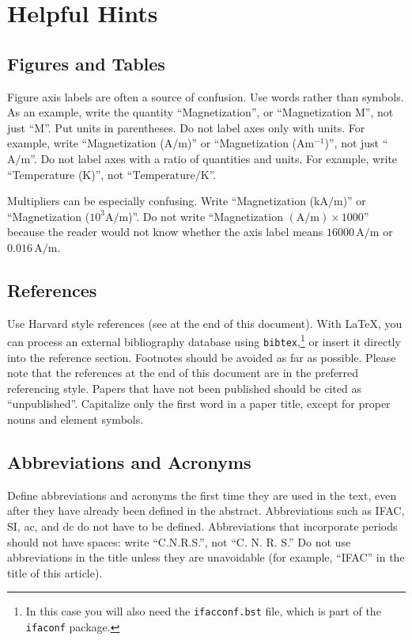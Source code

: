 \documentclass{ifacconf}
\begin{document}
\section{Helpful Hints}

\subsection{Figures and Tables}

Figure axis labels are often a source of confusion. Use words rather
than symbols. As an example, write the quantity ``Magnetization'', or
``Magnetization M'', not just ``M''. Put units in parentheses. Do not
label axes only with units.  For example, write ``Magnetization
($\mathrm{A}/\mathrm{m}$)'' or ``Magnetization ($\mathrm{A} \mathrm{m}^{-1}$)'', not just
 ``$\mathrm{A}/\mathrm{m}$''. Do not
label axes with a ratio of quantities and units. For example, write
``Temperature ($\mathrm{K}$)'', not ``$\mbox{Temperature}/\mathrm{K}$''.

Multipliers can be especially confusing. Write ``Magnetization
($\mathrm{kA}/\mathrm{m}$)'' or ``Magnetization ($10^3 \mathrm{A}/\mathrm{m}$)''. Do not write
``Magnetization $(\mathrm{A}/\mathrm{m}) \times 1000$'' because the reader would not know
whether the axis label means $16000\,\mathrm{A}/\mathrm{m}$ or $0.016\,\mathrm{A}/\mathrm{m}$.

\subsection{References}

Use Harvard style references (see at the end of this document). With
\LaTeX, you can process an external bibliography database 
using \texttt{bibtex},\footnote{In this case you will also need the \texttt{ifacconf.bst}
file, which is part of the \texttt{ifaconf} package.}
or insert it directly into the reference section. Footnotes should be avoided as
far as possible.  Please note that the references at the end of this
document are in the preferred referencing style. Papers that have not
been published should be cited as ``unpublished''.  Capitalize only the
first word in a paper title, except for proper nouns and element
symbols.

\subsection{Abbreviations and Acronyms}

Define abbreviations and acronyms the first time they are used in the
text, even after they have already been defined in the
abstract. Abbreviations such as IFAC, SI, ac, and dc do not have to be
defined. Abbreviations that incorporate periods should not have
spaces: write ``C.N.R.S.'', not ``C. N. R. S.'' Do not use abbreviations
in the title unless they are unavoidable (for example, ``IFAC'' in the
title of this article).
\end{document}
